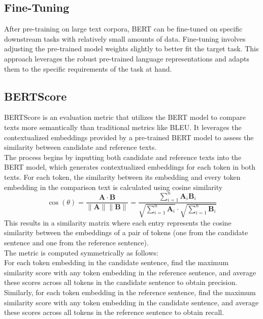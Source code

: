\subsection{Fine-Tuning}
After pre-training on large text corpora, BERT can be fine-tuned on specific downstream tasks with relatively small amounts of data. Fine-tuning involves adjusting the pre-trained model weights slightly to better fit the target task. This approach leverages the robust pre-trained language representations and adapts them to the specific requirements of the task at hand.




\subsection{BERTScore}
BERTScore is an evaluation metric that utilizes the BERT model to compare texts more semantically than traditional metrics like BLEU. It leverages the contextualized embeddings provided by a pre-trained BERT model to assess the similarity between candidate and reference texts.\\

The process begins by inputting both candidate and reference texts into the BERT model, which generates contextualized embeddings for each token in both texts. For each token, the similarity between its embedding and every token embedding in the comparison text is calculated using cosine similarity
\begin{equation}
    \cos(\theta) = \frac{\mathbf{A} \cdot \mathbf{B}}{\|\mathbf{A}\| \|\mathbf{B}\|} = \frac{\sum_{i=1}^{n} \mathbf{A}_{i} \mathbf{B}_{i} }{\sqrt{\sum_{i=1}^{n} \mathbf{A}_{i}} \cdot \sqrt{\sum_{i=1}^{n} \mathbf{B}_{i}} }
\end{equation}
This results in a similarity matrix where each entry represents the cosine similarity between the embeddings of a pair of tokens (one from the candidate sentence and one from the reference sentence).\\


The metric is computed symmetrically as follows:\\

For each token embedding in the candidate sentence, find the maximum similarity score with any token embedding in the reference sentence, and average these scores across all tokens in the candidate sentence to obtain precision.\\

Similarly, for each token embedding in the reference sentence, find the maximum similarity score with any token embedding in the candidate sentence, and average these scores across all tokens in the reference sentence to obtain recall.

